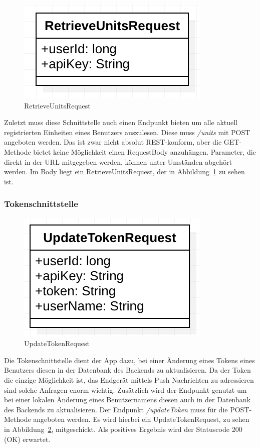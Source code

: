 \begin{figure}[h]
	\centering
	\includegraphics{include/img/retrieveunitsrequest}
	\caption{RetrieveUnitsRequest}
	\label{fig:retrieveUnitsRequest}
\end{figure}
Zuletzt muss diese Schnittstelle auch einen Endpunkt bieten um alle aktuell registrierten Einheiten eines Benutzers auszulesen. Diese muss \textit{/units} mit POST angeboten werden. Das ist zwar nicht absolut REST-konform, aber die GET-Methode bietet keine Möglichkeit einen RequestBody anzuhängen. Parameter, die direkt in der URL mitgegeben werden, können unter Umständen abgehört werden. Im Body liegt ein RetrieveUnitsRequest, der in Abbildung~\ref{fig:retrieveUnitsRequest} zu sehen ist.


\subsubsection{Tokenschnittstelle}
\begin{figure}[h]
	\centering
	\includegraphics{include/img/updatetokenrequest}
	\caption{UpdateTokenRequest}
	\label{fig:updateTokenRequest}
\end{figure}
Die Tokenschnittstelle dient der App dazu, bei einer Änderung eines Tokens eines Benutzers diesen in der Datenbank des Backends zu aktualisieren. Da der Token die einzige Möglichkeit ist, das Endgerät mittels Push Nachrichten zu adressieren sind solche Anfragen enorm wichtig. Zusätzlich wird der Endpunkt genutzt um bei einer lokalen Änderung eines Benutzernamens diesen auch in der Datenbank des Backends zu aktualisieren. Der Endpunkt \textit{/updateToken} muss für die POST-Methode angeboten werden. Es wird hierbei ein UpdateTokenRequest, zu sehen in Abbildung~\ref{fig:updateTokenRequest}, mitgeschickt. Als positives Ergebnis wird der Statuscode 200 (OK) erwartet.

